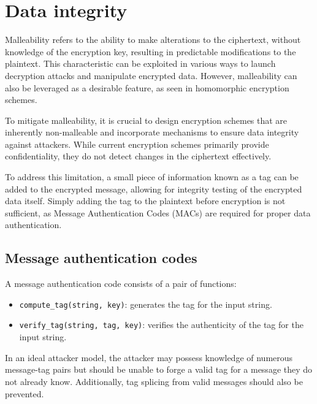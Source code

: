 \section{Data integrity}

Malleability refers to the ability to make alterations to the ciphertext, without knowledge of the encryption key, resulting in predictable modifications to the plaintext.
This characteristic can be exploited in various ways to launch decryption attacks and manipulate encrypted data.
However, malleability can also be leveraged as a desirable feature, as seen in homomorphic encryption schemes.

To mitigate malleability, it is crucial to design encryption schemes that are inherently non-malleable and incorporate mechanisms to ensure data integrity against attackers. 
While current encryption schemes primarily provide confidentiality, they do not detect changes in the ciphertext effectively.

To address this limitation, a small piece of information known as a tag can be added to the encrypted message, allowing for integrity testing of the encrypted data itself.
Simply adding the tag to the plaintext before encryption is not sufficient, as Message Authentication Codes (MACs) are required for proper data authentication.

\subsection{Message authentication codes}
A message authentication code consists of a pair of functions:
\begin{itemize}
    \item \texttt{compute\_tag(string, key)}: generates the tag for the input string.
    \item \texttt{verify\_tag(string, tag, key)}: verifies the authenticity of the tag for the input string.
\end{itemize}
In an ideal attacker model, the attacker may possess knowledge of numerous message-tag pairs but should be unable to forge a valid tag for a message they do not already know. 
Additionally, tag splicing from valid messages should also be prevented.

